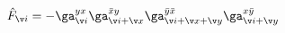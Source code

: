\begin{equation}
\label{Fga}
 \hat F_{\v i}= -
\ga^{yx}_{\v i}
\ga^{\bar x y}_{\v i+\v x}
\ga^{\bar  y\bar x}_{\v i+\v x+\v y}
\ga^{x \bar y}_{\v i+\v y}
\end{equation}

